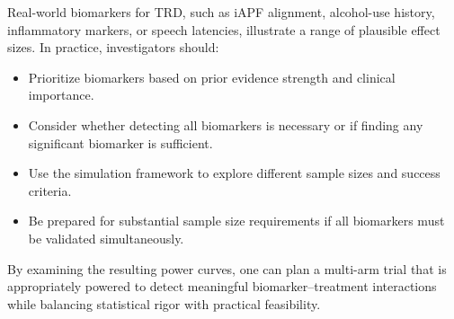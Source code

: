 \documentclass[11pt]{article}
\begin{document}
Real-world biomarkers for TRD, such as iAPF alignment, alcohol-use history, inflammatory markers, or speech latencies, illustrate a range of plausible effect sizes. In practice, investigators should:
\begin{itemize}
\item Prioritize biomarkers based on prior evidence strength and clinical importance.
\item Consider whether detecting all biomarkers is necessary or if finding any significant biomarker is sufficient.
\item Use the simulation framework to explore different sample sizes and success criteria.
\item Be prepared for substantial sample size requirements if all biomarkers must be validated simultaneously.
\end{itemize}

By examining the resulting power curves, one can plan a multi-arm trial that is appropriately powered to detect meaningful biomarker--treatment interactions while balancing statistical rigor with practical feasibility.

\pagebreak


\end{document}
